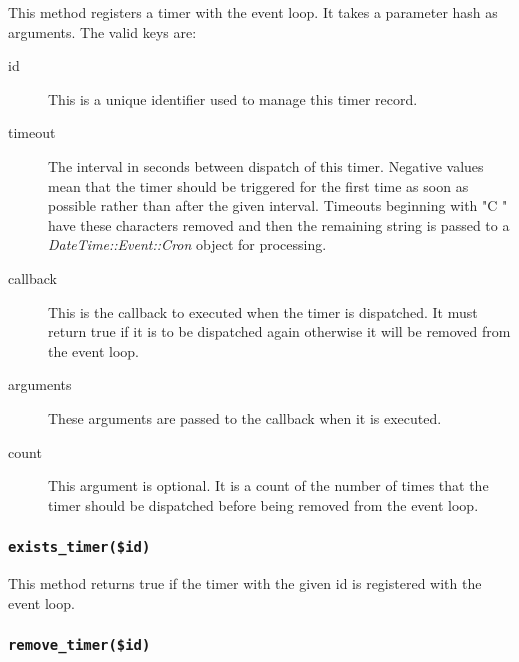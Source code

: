 This method registers a timer with the event loop.  It takes a parameter
hash as arguments.  The valid keys are:

\begin{description}

\item[{id}] \mbox{}

This is a unique identifier used to manage this timer record.


\item[{timeout}] \mbox{}

The interval in seconds between dispatch of this timer.  Negative
values mean that the timer should be triggered for the first time as
soon as possible rather than after the given interval.  Timeouts
beginning with "C " have these characters removed and then the
remaining string is passed to a \emph{DateTime::Event::Cron} object for
processing.


\item[{callback}] \mbox{}

This is the callback to executed when the timer is dispatched.
It must return true if it is to be dispatched again otherwise
it will be removed from the event loop.


\item[{arguments}] \mbox{}

These arguments are passed to the callback when it is executed.


\item[{count}] \mbox{}

This argument is optional.  It is a count of the number of times
that the timer should be dispatched before being removed from the event
loop.

\end{description}
\subsubsection*{\texttt{exists\_timer(\$id)}\label{xPL::Listener_exists_timer_id_}}


This method returns true if the timer with the given id is registered
with the event loop.

\subsubsection*{\texttt{remove\_timer(\$id)}\label{xPL::Listener_remove_timer_id_}}


